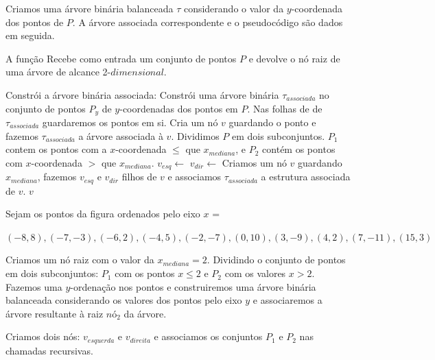 Criamos uma árvore binária balanceada $\tau$ considerando o valor da $y$-coordenada dos pontos
de $P$.
A árvore associada correspondente e o pseudocódigo são dados em seguida.

\begin{algorithm}[H]
    \caption{A função  Recebe como entrada um conjunto de pontos 
    $P$ e devolve o nó raiz de uma árvore de alcance 2-$dimensional$.}
    \begin{algorithmic}[1]
        \State Constrói a árvore binária associada: Constrói uma árvore binária $\tau_{associada}$ no conjunto de pontos
        $P_y$  de $y$-coordenadas dos pontos em $P$. Nas folhas de de $\tau_{associada}$ guardaremos
        os pontos em si.
            \State Cria um nó $v$ guardando o ponto e fazemos $\tau_{associada}$ a árvore associada 
            à $v$.
        \Else
            \State Dividimos $P$ em dois subconjuntos. $P_1$ contem os pontos com a $x$-coordenada $\leq$
            que $x_{mediana}$, e $P_2$ contém os pontos com $x$-coordenada $>$ que $x_{mediana}$.
            \State $v_{esq} \leftarrow $ 
            \State $v_{dir} \leftarrow $ 
            \State Criamos um nó $v$ guardando $x_{mediana}$, fazemos $v_{esq}$ e $v_{dir}$ filhos de 
            $v$ e associamos $\tau_{associada}$ a estrutura associada de $v$.
        \EndIf
    \Return $v$
    \EndFunction
    \end{algorithmic}
\end{algorithm}


Sejam os pontos da figura ordenados pelo eixo $x$ =

$(-8,8), (-7, -3), (-6, 2), (-4,5), (-2,-7),(0,10), (3,-9), (4,2), (7,-11), (15,3) $

Criamos um nó raiz com o valor da $x_{mediana} = 2$. Dividindo o conjunto de pontos em dois subconjuntos:
$P_1$ com os pontos $x\leq 2$ e $P_2$ com os valores $x > 2$.
Fazemos uma $y$-ordenação nos pontos e construiremos uma árvore binária balanceada considerando os 
valores dos pontos pelo eixo $y$ e associaremos a árvore resultante à raiz $nó_2$ da árvore.

Criamos dois nós: $v_{esquerda}$ e $v_{direita}$ e associamos os conjuntos $P_1$ e $P_2$ nas chamadas
recursivas.

